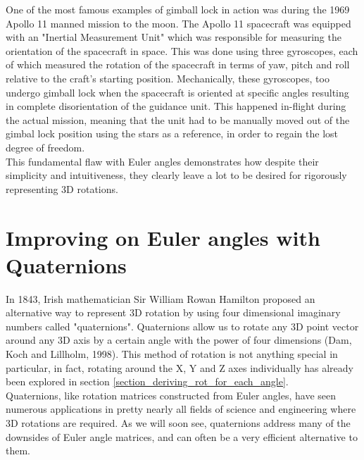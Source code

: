 \documentclass[12pt, a4paper]{article}
\begin{document}
One of the most famous examples of gimball lock in action was during the 1969
Apollo 11 manned mission to the moon. The Apollo 11 spacecraft was equipped with
an "Inertial Measurement Unit" which was responsible for measuring the
orientation of the spacecraft in space. This was done using three gyroscopes,
each of which measured the rotation of the spacecraft in terms of yaw, pitch and
roll relative to the craft's starting position. Mechanically, these gyroscopes,
too undergo gimball lock when the spacecraft is oriented at specific angles
resulting in complete disorientation of the guidance unit. This happened
in-flight during the actual mission, meaning that the unit had to be manually
moved out of the gimbal lock position using the stars as a reference, in order
to regain the lost degree of freedom. \\

This fundamental flaw with Euler angles demonstrates how despite their
simplicity and intuitiveness, they clearly leave a lot to be desired for
rigorously representing 3D rotations. \\


\section{Improving on Euler angles with Quaternions}
In 1843, Irish mathematician Sir William Rowan Hamilton proposed an alternative
way to represent 3D rotation by using four dimensional imaginary numbers called
"quaternions". Quaternions allow us to rotate any 3D point vector around any 3D
axis by a certain angle with the power of four dimensions (Dam, Koch and Lillholm, 1998). This method of
rotation is not anything special in particular, in fact, rotating around the X,
Y and Z axes individually has already been explored in section
\ref{section_deriving_rot_for_each_angle}. \\

Quaternions, like rotation matrices constructed from Euler angles, have seen
numerous applications in pretty nearly all fields of science and engineering
where 3D rotations are required. As we will soon see, quaternions address many
of the downsides of Euler angle matrices, and can often be a very efficient
alternative to them.
\end{document}
